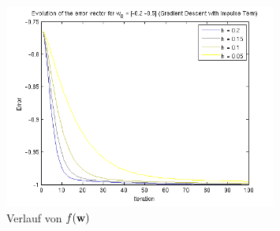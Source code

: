 \begin{figure}[h!]
  \centering
  \includegraphics[width=0.8\textwidth]{./figures/212/error_w02.png}
  \caption{Verlauf von $f(\mathbf{w})$}
  \label{fig:impulse_error_w02}
\end{figure}

\clearpage

